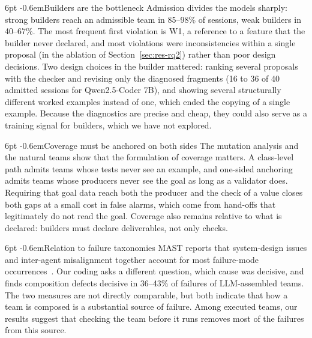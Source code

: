 \documentclass[pdflatex,sn-mathphys-num]{sn-jnl}
\makeatletter
\theoremstyle{thmstyleone}%
\theoremstyle{thmstyletwo}%
\theoremstyle{thmstylethree}%
\newcommand{\W}[1]{\textsf{W#1}}
\renewcommand\paragraph{\@startsection{paragraph}{4}{\z@}%
  {6pt \@plus 2pt \@minus 1pt}{-0.6em}{\normalfont\normalsize\bfseries}}
\makeatother
\begin{document}
\paragraph{Builders are the bottleneck} Admission divides the models sharply:
strong builders reach an admissible team in 85--98\% of sessions, weak builders
in 40--67\%. The most frequent first violation is \W{1}, a reference to a
feature that the builder never declared, and most violations were inconsistencies
within a single proposal (in the ablation of Section~\ref{sec:res-rq2}) rather
than poor design decisions. Two design choices in the builder mattered:
ranking several proposals with the checker and revising only the diagnosed
fragments (16 to 36 of 40 admitted sessions for Qwen2.5-Coder 7B), and showing
several structurally different worked examples instead of one, which ended the
copying of a single example. Because the
diagnostics are precise and cheap, they could also serve as a training signal
for builders, which we have not explored.

\paragraph{Coverage must be anchored on both sides} The mutation analysis and
the natural teams show that the formulation of coverage matters. A class-level
path admits teams whose tests never see an example, and one-sided anchoring
admits teams whose producers never see the goal as long as a validator does.
Requiring that goal data reach both the producer and the check of a value
closes both gaps at a small cost in false alarms, which come from hand-offs that
legitimately do not read the goal. Coverage also remains relative to what is
declared: builders must declare deliverables, not only checks.

\paragraph{Relation to failure taxonomies} MAST reports that system-design
issues and inter-agent misalignment together account for most failure-mode
occurrences~\cite{cemri2025mast}. Our coding asks a different question, which
cause was decisive, and finds composition defects decisive in 36--43\% of
failures of LLM-assembled teams. The two measures are not directly comparable,
but both indicate that how a team is composed is a substantial source of
failure. Among executed teams, our results suggest that checking the team
before it runs removes most of the failures from this source.
\end{document}
